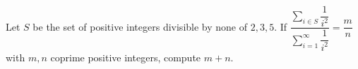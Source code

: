 Let $S$ be the set of positive integers divisible by none of $2,3,5$. If $\dfrac{\sum_{i\in S}\dfrac1{i^2}}{\sum_{i=1}^{\infty}\dfrac1{i^2}}=\dfrac mn$ with $m,n$ coprime positive integers, compute $m+n$.
